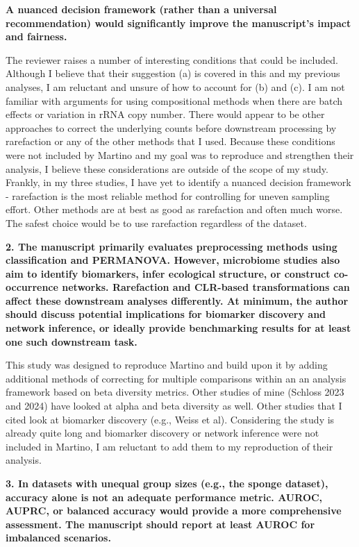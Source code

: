 \documentclass[
  11pt,
]{article}
\begin{document}
\textbf{A nuanced decision framework (rather than a universal
recommendation) would significantly improve the manuscript's impact and
fairness.}

The reviewer raises a number of interesting conditions that could be
included. Although I believe that their suggestion (a) is covered in
this and my previous analyses, I am reluctant and unsure of how to
account for (b) and (c). I am not familiar with arguments for using
compositional methods when there are batch effects or variation in rRNA
copy number. There would appear to be other approaches to correct the
underlying counts before downstream processing by rarefaction or any of
the other methods that I used. Because these conditions were not
included by Martino and my goal was to reproduce and strengthen their
analysis, I believe these considerations are outside of the scope of my
study. Frankly, in my three studies, I have yet to identify a nuanced
decision framework - rarefaction is the most reliable method for
controlling for uneven sampling effort. Other methods are at best as
good as rarefaction and often much worse. The safest choice would be to
use rarefaction regardless of the dataset.

\textbf{2. The manuscript primarily evaluates preprocessing methods
using classification and PERMANOVA. However, microbiome studies also aim
to identify biomarkers, infer ecological structure, or construct
co-occurrence networks. Rarefaction and CLR-based transformations can
affect these downstream analyses differently. At minimum, the author
should discuss potential implications for biomarker discovery and
network inference, or ideally provide benchmarking results for at least
one such downstream task.}

This study was designed to reproduce Martino and build upon it by adding
additional methods of correcting for multiple comparisons within an an
analysis framework based on beta diversity metrics. Other studies of
mine (Schloss 2023 and 2024) have looked at alpha and beta diversity as
well. Other studies that I cited look at biomarker discovery (e.g.,
Weiss et al). Considering the study is already quite long and biomarker
discovery or network inference were not included in Martino, I am
reluctant to add them to my reproduction of their analysis.

\textbf{3. In datasets with unequal group sizes (e.g., the sponge
dataset), accuracy alone is not an adequate performance metric. AUROC,
AUPRC, or balanced accuracy would provide a more comprehensive
assessment. The manuscript should report at least AUROC for imbalanced
scenarios.}
\end{document}
